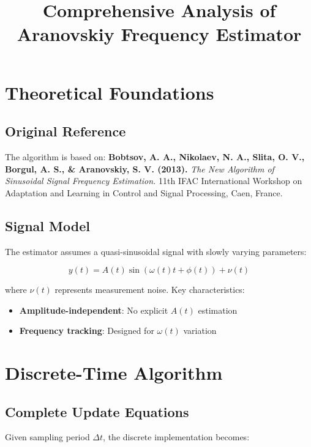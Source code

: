 \documentclass{article}
\title{Comprehensive Analysis of Aranovskiy Frequency Estimator}
\author{}
\date{}
\begin{document}
\maketitle

\section{Theoretical Foundations}

\subsection{Original Reference}
The algorithm is based on:\newline
\textbf{Bobtsov, A. A., Nikolaev, N. A., Slita, O. V., Borgul, A. S., \& Aranovskiy, S. V. (2013).}\newline
\textit{The New Algorithm of Sinusoidal Signal Frequency Estimation.}\newline
11th IFAC International Workshop on Adaptation and Learning in Control and Signal Processing, Caen, France.

\subsection{Signal Model}
The estimator assumes a quasi-sinusoidal signal with slowly varying parameters:

\begin{equation}
y(t) = A(t)\sin(\omega(t)t + \phi(t)) + \nu(t)
\end{equation}

where $\nu(t)$ represents measurement noise. Key characteristics:
\begin{itemize}
\item \textbf{Amplitude-independent}: No explicit $A(t)$ estimation
\item \textbf{Frequency tracking}: Designed for $\omega(t)$ variation
\end{itemize}

\section{Discrete-Time Algorithm}

\subsection{Complete Update Equations}
Given sampling period $\Delta t$, the discrete implementation becomes:
\end{document}
